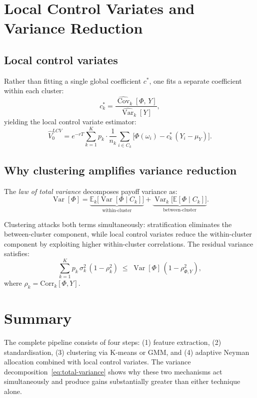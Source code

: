 \documentclass[12pt, a4paper]{report}
\theoremstyle{definition}
\newcommand{\Var}{\operatorname{Var}}
\newcommand{\Cov}{\operatorname{Cov}}
\begin{document}
\section{Local Control Variates and Variance Reduction}
\label{sec:local-cv}

\subsection{Local control variates}

Rather than fitting a single global coefficient $c^*$, one fits a
separate coefficient within each cluster:
\begin{equation}
    c_k^* = \frac{\widehat{\Cov}_k[\Phi,\, Y]}
    {\widehat{\Var}_k[Y]},
    \label{eq:local-cv-coeff}
\end{equation}
yielding the local control variate estimator:
\begin{equation}
    \hat{V}_0^{LCV} = e^{-rT} \sum_{k=1}^{K} p_k \cdot
    \frac{1}{n_k} \sum_{i \in C_k}
    \bigl[\Phi(\omega_i) - c_k^*\,(Y_i - \mu_Y)\bigr].
    \label{eq:local-cv-estimator}
\end{equation}

\subsection{Why clustering amplifies variance reduction}

The \emph{law of total variance} decomposes payoff variance as:
\begin{equation}
    \Var[\Phi] = \underbrace{\mathbb{E}_k\bigl[\Var[\Phi \mid C_k]\bigr]}_{\text{within-cluster}}
    + \underbrace{\Var_k\bigl[\mathbb{E}[\Phi \mid C_k]\bigr]}_{\text{between-cluster}}.
    \label{eq:total-variance}
\end{equation}

Clustering attacks both terms simultaneously: stratification eliminates
the between-cluster component, while local control variates reduce the
within-cluster component by exploiting higher within-cluster
correlations.  The residual variance satisfies:
\[
    \sum_{k=1}^K p_k\,\sigma_k^2\,(1 - \rho_k^2)
    \;\leq\; \Var[\Phi]\,(1 - \rho_{\Phi,Y}^2),
\]
where $\rho_k = \mathrm{Corr}_k[\Phi, Y]$.

\section{Summary}
\label{sec:clustering-summary}

The complete pipeline consists of four steps: (1) feature extraction,
(2) standardisation, (3) clustering via K-means or GMM, and (4) adaptive
Neyman allocation combined with local control variates.  The variance
decomposition~\eqref{eq:total-variance} shows why these two mechanisms
act simultaneously and produce gains substantially greater than either
technique alone.
\end{document}
